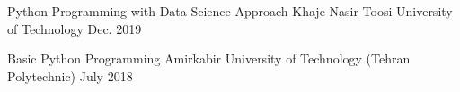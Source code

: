 \begin{cvhonors}
  \cvhonor
    {Python Programming with Data Science Approach} %
    {Khaje Nasir Toosi University of Technology} %
    {} %
    {Dec. 2019} %

  \cvhonor
    {Basic Python Programming} %
    {Amirkabir University of Technology (Tehran Polytechnic)} %
    {} %
    {July 2018} %

\end{cvhonors}